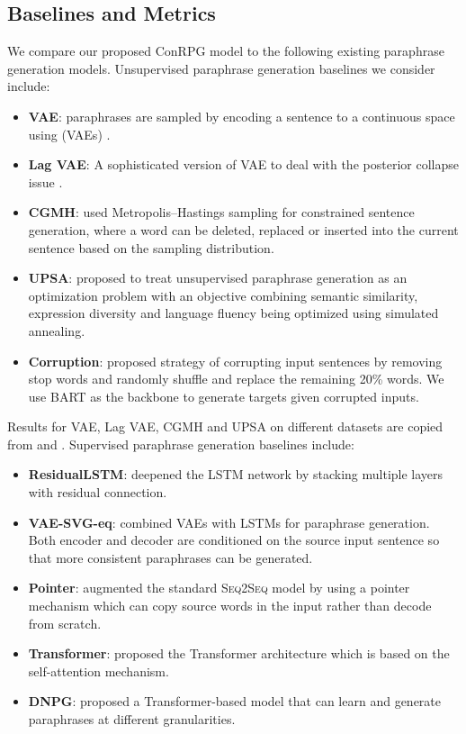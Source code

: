 \documentclass[11pt,a4paper]{article}
\newcommand{\sts}{{{\textsc{Seq2Seq}}}\xspace}
\begin{document}
\subsection{Baselines and Metrics}
We compare our proposed ConRPG model to the following existing  paraphrase generation models.
Unsupervised paraphrase generation baselines we consider include:
\begin{itemize}[noitemsep]
  \item {\bf VAE}:  
  paraphrases are sampled by encoding a sentence to a continuous space using  (VAEs) \cite{bowman-etal-2016-generating}. 
  \item {\bf Lag VAE}: 
  A sophisticated version of VAE to deal with the posterior collapse issue \citet{he2019lagging}.
  \item {\bf CGMH}: \citet{miao2019cgmh} used Metropolis–Hastings sampling for constrained sentence generation, where a word can be deleted, replaced or inserted into the current sentence based on the sampling distribution.
  \item {\bf UPSA}: \citet{liu2019unsupervised} proposed to treat unsupervised paraphrase generation as an optimization problem with an objective combining semantic similarity, expression diversity and language fluency being optimized  using simulated annealing.
  \item {\bf Corruption}: \cite{hegde2020unsupervised} proposed strategy of corrupting input sentences by  removing stop words and randomly shuffle and replace the remaining 20\% words. We use BART \cite{lewis2019bart} as the backbone to generate targets given corrupted inputs.  
\end{itemize}
Results for 
VAE, Lag VAE, CGMH and UPSA on different datasets are copied from  and . 
Supervised paraphrase generation baselines include:
\begin{itemize}[noitemsep]
  \item {\bf ResidualLSTM}: \citet{prakash-etal-2016-neural} deepened the LSTM network by stacking multiple layers with residual connection.
  \item {\bf VAE-SVG-eq}: \citet{gupta2018deep} combined VAEs with LSTMs for paraphrase generation. Both encoder and decoder are conditioned on the source input sentence so that more consistent paraphrases can be generated.
  \item {\bf Pointer}: \citet{see-etal-2017-get} augmented the standard \sts model by using a pointer mechanism which can copy source words in the input rather than decode from scratch.
  \item {\bf Transformer}: \citet{vaswani2017attention} proposed the Transformer architecture which is based on the self-attention mechanism.
  \item {\bf DNPG}: \citet{li-etal-2019-decomposable} proposed a Transformer-based model that can learn and generate paraphrases at different  granularities.
\end{itemize}
\end{document}
